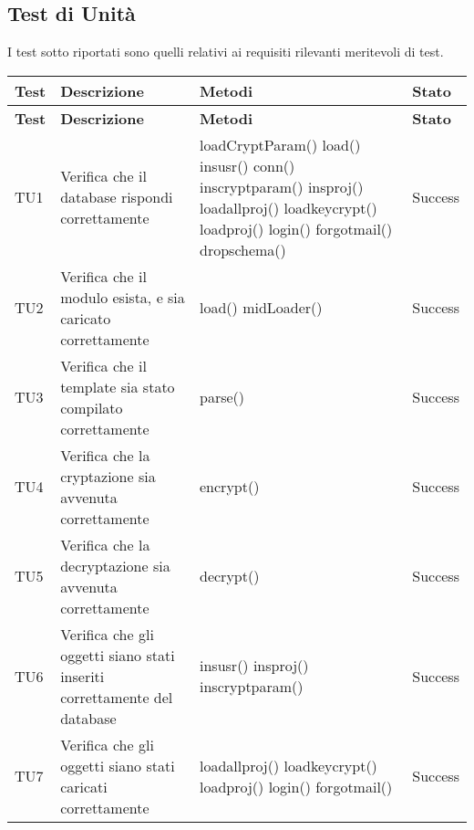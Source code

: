 \subsection{Test di Unità}
I test sotto riportati sono quelli relativi ai requisiti rilevanti meritevoli di test.
\begin{longtable}{p{2cm}!{\VRule[1pt]}p{5cm}!{\VRule[1pt]}p{4.5cm}!{\VRule[1pt]}p{1.5cm}}
\color{white} \textbf{Test} & \color{white} \textbf{Descrizione}  & \color{white} \textbf{Metodi}  & \color{white} \textbf{Stato}\\ 
\endfirsthead 
{} 
\color{white} \textbf{Test} & \color{white} \textbf{Descrizione}  & \color{white} \textbf{Metodi}  & \color{white} \textbf{Stato}\\  
\endhead 

TU1 & Verifica che il database rispondi correttamente & loadCryptParam() \newline load() \newline insusr() \newline conn() \newline inscryptparam() \newline insproj() \newline loadallproj() \newline loadkeycrypt() \newline loadproj() \newline login() \newline forgotmail() \newline dropschema() & Success  \\ 
TU2 & Verifica che il modulo esista, e sia caricato correttamente & load() \newline midLoader() & Success  \\ 
TU3 & Verifica che il template sia stato compilato correttamente & parse() & Success  \\ 
TU4 & Verifica che la cryptazione sia avvenuta correttamente & encrypt() & Success  \\ 
TU5 & Verifica che la decryptazione sia avvenuta correttamente & decrypt() & Success  \\ 
TU6 & Verifica che gli oggetti siano stati inseriti correttamente del database & insusr() \newline insproj() \newline inscryptparam() & Success  \\ 
TU7 & Verifica che gli oggetti siano stati caricati correttamente & loadallproj() \newline loadkeycrypt() \newline loadproj() \newline login() \newline forgotmail() & Success  \\ 

\end{longtable}
